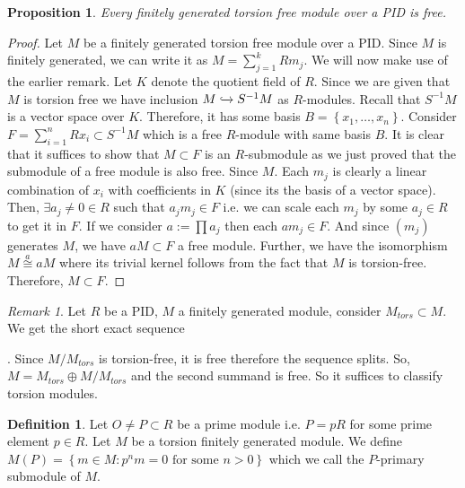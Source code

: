 \documentclass{article}
\theoremstyle{definition}
\newtheorem{definition}{Definition}[subsection]
\theoremstyle{remark}
\newtheorem*{remark}{Remark}
\theoremstyle{plain}
\newtheorem{prop}{Proposition}[subsection]
\begin{document}
\begin{prop}
    Every finitely generated torsion free module over a PID is free. 
\end{prop}
\begin{proof}
    Let \(M\) be a finitely generated torsion free module over a PID. Since \(M\)
    is finitely generated, we can write it as \(M = \sum\limits_{j=1}^{k}Rm_j\). We will now make
    use of the earlier remark. Let \(K\) denote the quotient field of \(R\). Since we are given that \(M\)
    is torsion free we have inclusion \(M \xhookrightarrow{} S^{-1}M\) as \(R\)-modules. Recall that \(S^{-1}M\) 
    is a vector space over \(K\). Therefore, it has some basis \(B = \left\{ x_1, \ldots, x_n \right\}\). Consider
    \(F = \sum\limits_{i=1}^n Rx_i \subset S^{-1}M\) which is a free \(R\)-module with same basis \(B\). It is clear that
    it suffices to show that \(M \subset F\) is an \(R\)-submodule as we just proved that the submodule of a free module is also
    free. Since \(M\). Each \(m_j\) is clearly a linear combination of \(x_i\) with coefficients in \(K\) (since its the basis of a vector space). 
    Then, \(\exists a_j \neq 0 \in R\) such that \(a_jm_j \in F\) i.e. we can scale each \(m_j\) by some \(a_j \in R\) to get it in \(F\).
    If we consider \(a := \prod a_j\) then each \(am_j \in F\). And since \((m_j)\) generates \(M\), we have \(aM \subset F\) a free module. 
    Further, we have the isomorphism \(M \stackrel{a}{\cong} aM\) where its trivial kernel follows from the fact that \(M\) is torsion-free. 
    Therefore, \(M \subset F\).
\end{proof}

\begin{remark}
    Let \(R\) be a PID, \(M\) a finitely generated module, consider \(M_{tors}\subset M\). 
    We get the short exact sequence 
    .
    Since \(M/M_{tors}\) is torsion-free, it is free therefore the sequence splits. So, \(M = M_{tors}\oplus M/M_{tors}\) and the second
    summand is free. So it suffices to classify torsion modules. 
\end{remark}

\begin{definition}
    Let \(O \neq P \subset R\) be a prime module i.e. \(P = pR\) for some prime element \(p \in R\). Let \(M\)
    be a torsion finitely generated module. We define \(M(P) = \left\{ m \in M: p^nm = 0 \text{ for some } n > 0 \right\}\)
    which we call the \(P\)-primary submodule of \(M\).
\end{definition}
\end{document}
